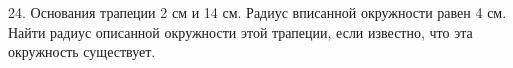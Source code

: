 24. Основания трапеции 2 см и 14 см. Радиус вписанной окружности равен 4 см. Найти радиус описанной окружности этой трапеции, если известно, что эта окружность существует.\\
